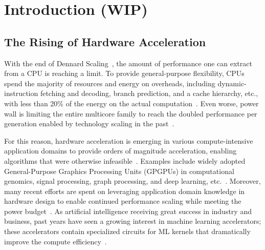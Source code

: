 \chapter{Introduction (WIP)}

\section{The Rising of Hardware Acceleration}

With the end of Dennard Scaling~\cite{dennard}, the amount of performance one can extract from a CPU is reaching a limit.
To provide general-purpose flexibility, CPUs spend the majority of resources and energy on overheads, 
including dynamic-instruction fetching and decoding, branch prediction, and a cache hierarchy, etc., 
with less than 20\% of 
the energy on the actual computation~\cite{mark}.
Even worse, power wall is limiting the entire multicore family
to reach the doubled performance per generation enabled by technology scaling in the 
past~\cite{multicorescale}.

For this reason, hardware acceleration is emerging in various compute-intensive application domains 
to provide orders of magnitude acceleration, enabling algorithms that were otherwise
infeasible~\cite{genomicaccel, bioaccel, fpgadeeplearn, fpgacripto}.
Examples include widely adopted General-Purpose Graphics Processing Units (GPGPUs) 
in computational genomics, signal processing, graph processing, and
deep learning, etc.~\cite{genomicaccel, bioaccel, fpgacloudsurvey}.
Moreover, many recent efforts are spent on leveraging application domain knowledge in hardware design to enable 
continued performance scaling while meeting the power budget~\cite{turinglecture}.
As artificial intelligence receiving great success in industry and business,
past years have seen a growing interest in machine learning accelerators;
these accelerators contain specialized circuits for ML kernels that dramatically improve the compute
efficiency~\cite{dadiannao,tpu,eie,chen2017eyeriss,tangram,truenorth}.

